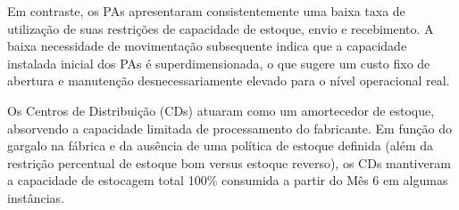 Em contraste, os PAs apresentaram consistentemente uma baixa taxa de utilização de suas restrições de capacidade de estoque, envio e recebimento. A baixa necessidade de movimentação subsequente indica que a capacidade instalada inicial dos PAs é superdimensionada, o que sugere um custo fixo de abertura e manutenção desnecessariamente elevado para o nível operacional real.

Os Centros de Distribuição (CDs) atuaram como um amortecedor de estoque, absorvendo a capacidade limitada de processamento do fabricante. Em função do gargalo na fábrica e da ausência de uma política de estoque definida (além da restrição percentual de estoque bom versus estoque reverso), os CDs mantiveram a capacidade de estocagem total 100\% consumida a partir do Mês 6 em algumas instâncias.